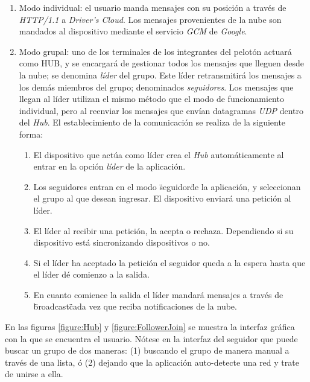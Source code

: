 \begin{enumerate}
	\item Modo individual: el usuario manda mensajes con su posición a través de
	\emph{HTTP/1.1} a \emph{Driver's Cloud}. Los mensajes provenientes de la nube
	son mandados al dispositivo mediante el servicio \emph{GCM} de \emph{Google}.

	\item Modo grupal: uno de los terminales de los integrantes del pelotón actuará
	como HUB, y se encargará de	gestionar todos los mensajes que lleguen desde la
	nube; se denomina \emph{líder} del grupo. Este líder retransmitirá los mensajes
	a los demás miembros del grupo; denominados \emph{seguidores}. Los mensajes que
	llegan al líder utilizan el mismo método que el modo de funcionamiento individual,
	pero al reenviar los mensajes que envían datagramas \emph{UDP} dentro del
	\emph{Hub}. El establecimiento de la comunicación se realiza de la siguiente
	forma:

	\begin{enumerate}
		\item El dispositivo que actúa como líder crea el \emph{Hub} automáticamente
		al entrar en la opción \emph{líder} de la aplicación.

		\item Los seguidores entran en el modo \"seguidor\" de la aplicación, y seleccionan
		el grupo al que desean ingresar. El dispositivo enviará una petición al líder.

		\item El líder al recibir una petición, la acepta o rechaza. Dependiendo si
		su dispositivo está sincronizando dispositivos o no.

		\item Si el líder ha aceptado la petición el seguidor queda a la espera hasta
		que el líder dé comienzo a la salida.

		\item En cuanto comience la salida el líder mandará mensajes a través de \"broadcast\"
		cada vez que reciba notificaciones de la nube.
	\end{enumerate}
\end{enumerate}

En las figuras \ref{figure:Hub} y \ref{figure:FollowerJoin} se muestra la interfaz
gráfica con la que se encuentra el usuario. Nótese en la interfaz del seguidor
que puede buscar un grupo de dos maneras: (1) buscando el grupo de manera manual
a través de una lista, ó (2) dejando que la aplicación auto-detecte una red y trate
de unirse a ella.

